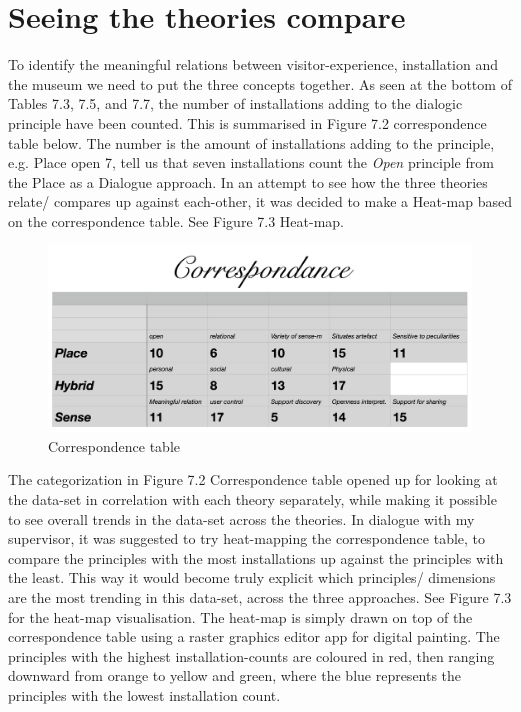 \section{Seeing the theories compare}
To identify the meaningful relations between visitor-experience, installation and the museum we need to put the three concepts together. As seen at the bottom of Tables 7.3, 7.5, and 7.7, the number of installations adding to the dialogic principle have been counted. This is summarised in Figure 7.2 correspondence table below. The number is the amount of installations adding to the principle, e.g. Place open 7, tell us that seven installations count the \emph{Open} principle from the Place as a Dialogue approach. In an attempt to see how the three theories relate/ compares up against each-other, it was decided to make a Heat-map based on the correspondence table. See Figure 7.3 Heat-map.

\begin{figure}[H]
    \centering
    \includegraphics[width=13cm]{pictures/analysis/correspondence.png}
    \caption{Correspondence table}
\end{figure}

The categorization in Figure 7.2 Correspondence table opened up for looking at the data-set in correlation with each theory separately, while making it possible to see overall trends in the data-set across the theories. In dialogue with my supervisor, it was suggested to try heat-mapping the correspondence table, to compare the principles with the most installations up against the principles with the least. This way it would become truly explicit which principles/ dimensions are the most trending in this data-set, across the three approaches.  See Figure 7.3 for the heat-map visualisation. The heat-map is simply drawn on top of the correspondence table using a raster graphics editor app for digital painting. The principles with the highest installation-counts are coloured in red, then ranging downward from orange to yellow and green, where the blue represents the principles with the lowest installation count.

